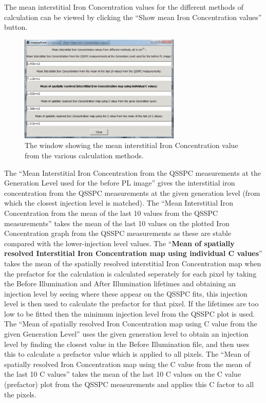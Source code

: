 \documentclass[final,a4paper,oneside,12pt]{article}
\begin{document}
The mean interstitial Iron Concentration values for the different methods of calculation can be viewed by clicking the ``Show mean Iron Concentration values'' button.

\begin{figure}[h!]
\includegraphics[height=2in]{meanvalues}
\caption{\label{figure2} The window showing the mean interstitial Iron Concentration value from the various calculation methods.}
\end{figure}

The ``Mean Interstitial Iron Concentration from the QSSPC measurements at the Generation Level used for the before PL image'' gives the interstitial iron concentration from the QSSPC measurements at the given generation level (from which the closest injection level is matched). The ``Mean Interstitial Iron Concentration from the mean of the last 10 values from the QSSPC measurements'' takes the mean of the last 10 values on the plotted Iron Concentration graph from the QSSPC measurements as these are stable compared with the lower-injection level values. The ``{\bf Mean of spatially resolved Interstitial Iron Concentration map using individual C values}'' takes the mean of the spatially resolved interstitial Iron Concentration map when the prefactor for the calculation is calculated seperately for each pixel by taking the Before Illumination and After Illumination lifetimes and obtaining an injection level by seeing where these appear on the QSSPC fits, this injection level is then used to calculate the prefactor for that pixel. If the lifetimes are too low to be fitted then the minimum injection level from the QSSPC plot is used. The ``Mean of spatially resolved Iron Concentration map using C value from the given Generation Level'' uses the given generation level to obtain an injection level by finding the closest value in the Before Illumination file, and then uses this to calculate a prefactor value which is applied to all pixels. The ``Mean of spatially resolved Iron Concentration map using the C value from the mean of the last 10 C values'' takes the mean of the last 10 C values on the C value (prefactor) plot from the QSSPC measurements and applies this C factor to all the pixels.
\end{document}
